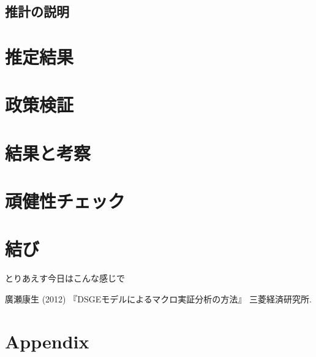 \documentclass[dvipdfmx,autodetect-engine,11pt]{jsarticle}
\begin{document}
\subsection{推計の説明}

\section{推定結果}

\section{政策検証}

\section{結果と考察}

\section{頑健性チェック}

\maketitle%
\section{結び}
とりあえす今日はこんな感じで

\maketitle
{}
\begin{thebibliography}{99}
	\bibitem {}廣瀬康生 (2012) 『DSGEモデルによるマクロ実証分析の方法』 三菱経済研究所.
 \end{thebibliography}

\maketitle
{}
\section*{Appendix}
\end{document}

